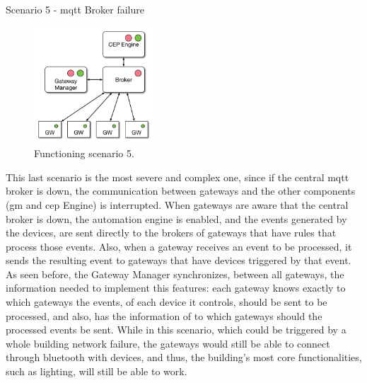 \begin{Paragraph}{Scenario 5 - \ac{mqtt} Broker failure}
	\begin{figure}[H]
		\centering
		\includegraphics[width=0.4\textwidth]{figures/fs3.png}
		\caption{Functioning scenario 5.}
		\label{fig:fs3}
	\end{figure}

This last scenario is the most severe and complex one, since if the central \ac{mqtt} broker is down, the communication between gateways and the other components (\ac{gm} and \ac{cep} Engine) is interrupted. When gateways are aware that the central broker is down, the automation engine is enabled, and the events generated by the devices, are sent directly to the brokers of gateways that have rules that process those events. Also, when a gateway receives an event to be processed, it sends the resulting event to gateways that have devices triggered by that event. As seen before, the Gateway Manager synchronizes, between all gateways, the information needed to implement this features: each gateway knows exactly to which gateways the events, of each device it controls, should be sent to be processed, and also, has the information of to which gateways should the processed events be sent. While in this scenario, which could be triggered by a whole building network failure, the gateways would still be able to connect through bluetooth with devices, and thus, the building's most core functionalities, such as lighting, will still be able to work. 

\end{Paragraph}

